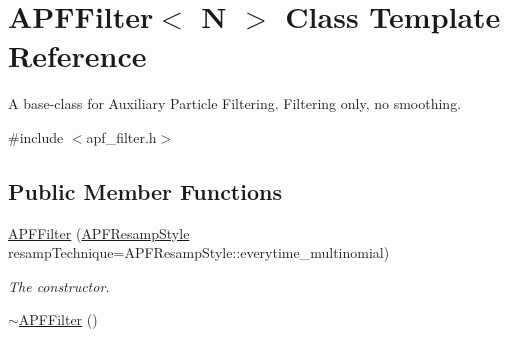 \hypertarget{classAPFFilter}{}\section{A\+P\+F\+Filter$<$ N $>$ Class Template Reference}
\label{classAPFFilter}


A base-\/class for Auxiliary Particle Filtering. Filtering only, no smoothing.  




{\ttfamily \#include $<$apf\+\_\+filter.\+h$>$}

\subsection*{Public Member Functions}
\begin{DoxyCompactItemize}
\item 
\hyperlink{classAPFFilter_ad694644c5526bf4b962b5016a37e65da}{A\+P\+F\+Filter} (\hyperlink{apf__filter_8h_a187a7338bc8872e7607cf1ea4ffed47b}{A\+P\+F\+Resamp\+Style} resamp\+Technique=A\+P\+F\+Resamp\+Style\+::everytime\+\_\+multinomial)
\begin{DoxyCompactList}\small\item\em The constructor. \end{DoxyCompactList}\item 
\hyperlink{classAPFFilter_a77981b917396b33b51d9c711c5d97c36}{$\sim$\+A\+P\+F\+Filter} ()\hypertarget{classAPFFilter_a77981b917396b33b51d9c711c5d97c36}{}\label{classAPFFilter_a77981b917396b33b51d9c711c5d97c36}


\end{DoxyCompactItemize}
